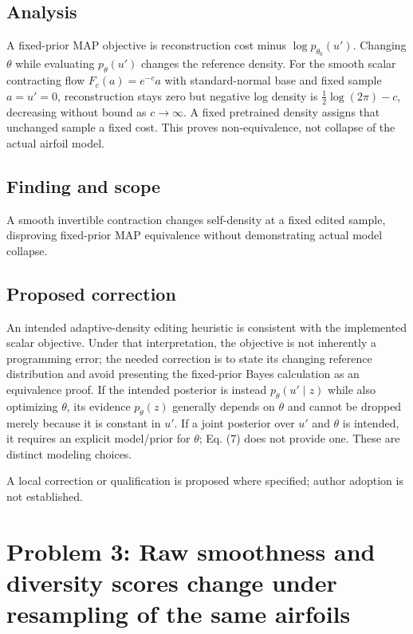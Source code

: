 \documentclass[11pt]{article}
\begin{document}
\subsection*{Analysis}

A fixed-prior MAP objective is reconstruction cost minus \(\log p_{\theta_0}(u')\). Changing \(\theta\) while evaluating \(p_\theta(u')\) changes the reference density. For the smooth scalar contracting flow \(F_c(a)=e^{-c}a\) with standard-normal base and fixed sample \(a=u'=0\), reconstruction stays zero but negative log density is \(\tfrac12\log(2\pi)-c\), decreasing without bound as \(c\to\infty\). A fixed pretrained density assigns that unchanged sample a fixed cost. This proves non-equivalence, not collapse of the actual airfoil model.

\subsection*{Finding and scope}

A smooth invertible contraction changes self-density at a fixed edited sample, disproving fixed-prior MAP equivalence without demonstrating actual model collapse.

\subsection*{Proposed correction}

An intended adaptive-density editing heuristic is consistent with the implemented scalar objective. Under that interpretation, the objective is not inherently a programming error; the needed correction is to state its changing reference distribution and avoid presenting the fixed-prior Bayes calculation as an equivalence proof. If the intended posterior is instead \(p_\theta(u'\mid z)\) while also optimizing \(\theta\), its evidence \(p_\theta(z)\) generally depends on \(\theta\) and cannot be dropped merely because it is constant in \(u'\). If a joint posterior over \(u'\) and \(\theta\) is intended, it requires an explicit model/prior for \(\theta\); Eq. (7) does not provide one. These are distinct modeling choices.

A local correction or qualification is proposed where specified; author adoption is not established.

\section*{Problem 3: Raw smoothness and diversity scores change under resampling of the same airfoils}
\end{document}
